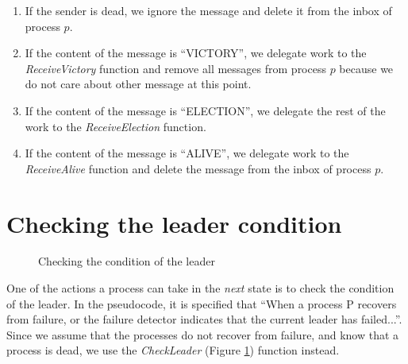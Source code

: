 \documentclass{report}
\newcommand*{\sans}{\fontfamily{lmss}\selectfont}
\begin{document}
\begin{enumerate}[wide, labelwidth=!, labelindent=0pt]
  \item If the sender is dead, we ignore the message and delete it from the inbox of process $p$.
  \item If the content of the message is {\sans ``VICTORY''}, we delegate work to the \textit{ReceiveVictory} function and remove all messages from process $p$ because we do not care about other message at this point.
  \item If the content of the message is {\sans ``ELECTION''}, we delegate the rest of the work to the \textit{ReceiveElection} function.
  \item If the content of the message is {\sans ``ALIVE''}, we delegate work to the \textit{ReceiveAlive} function and delete the message from the inbox of process $p$.
\end{enumerate}

\section{Checking the leader condition}

\begin{figure}
\tlatex

\@xx{}%
%
%
%
%
%


\fl{}\bottombar\cl{}

\caption{Checking the condition of the leader}
\label{checkleader}
\end{figure}

One of the actions a process can take in the \textit{next} state is to check the condition of the leader.
In the pseudocode, it is specified that ``When a process P recovers from failure, or the failure detector indicates that the current leader has failed...''. Since we assume that the processes do not recover from failure, and know that a process is dead, we use the \textit{CheckLeader} (Figure \ref{checkleader}) function instead.
\end{document}
